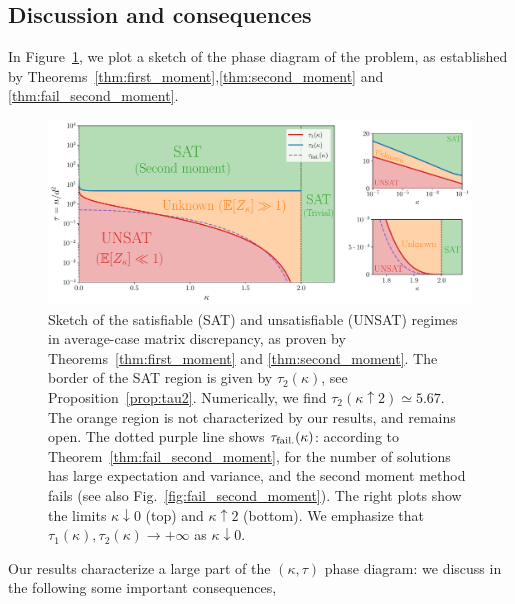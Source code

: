 \subsection{Discussion and consequences}\label{subsec:discussion}

In Figure~\ref{fig:phase_diagram}, we plot a sketch of the phase diagram of the problem, as established by Theorems~\ref{thm:first_moment},\ref{thm:second_moment} and \ref{thm:fail_second_moment}. 
\begin{figure}[!t]
    \centering
    \includegraphics[width=1.0\textwidth]{figures/phase_diagram.pdf}
    \caption{
        Sketch of the satisfiable (SAT) and unsatisfiable (UNSAT) regimes in average-case matrix discrepancy, 
        as proven by Theorems~\ref{thm:first_moment} and \ref{thm:second_moment}. 
        The border of the SAT region  is given by $\tau_2(\kappa)$, see Proposition~\ref{prop:tau2}. 
        Numerically, we find $\tau_2(\kappa \uparrow 2) \simeq 5.67$.
        The orange region is not characterized by our results, and remains open.
        The dotted purple line shows $\tau_{\rm fail.}(\kappa)$: according to Theorem~\ref{thm:fail_second_moment}, for  the number of solutions 
        has large expectation and variance, and the second moment method fails (see also Fig.~\ref{fig:fail_second_moment}).
        The right plots show the limits $\kappa \downarrow 0$ (top) and $\kappa \uparrow 2$ (bottom).
        We emphasize that $\tau_1(\kappa), \tau_2(\kappa) \to +\infty$ as $\kappa \downarrow 0$.
    \label{fig:phase_diagram}}
\end{figure}
Our results characterize a large part of the $(\kappa, \tau)$ phase diagram: 
we discuss in the following some important consequences, 

